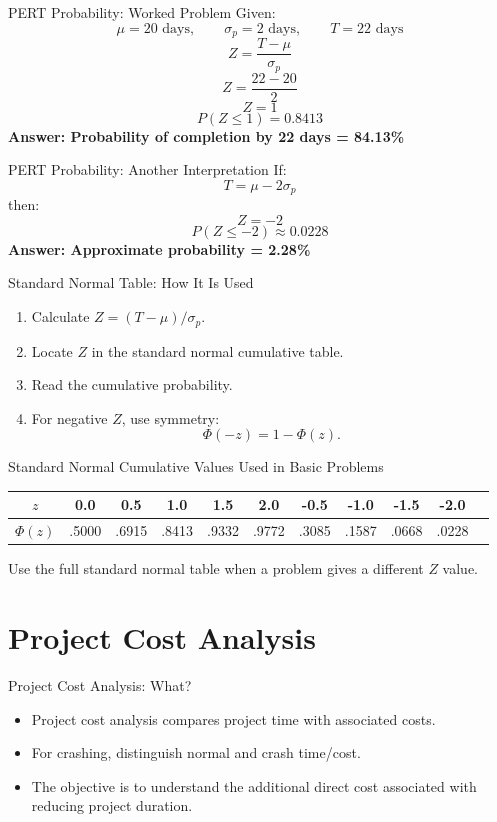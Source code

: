 \documentclass[aspectratio=169,10pt]{beamer}
\newcommand{\answer}[1]{\textbf{Answer: #1}}
\begin{document}
\begin{frame}{PERT Probability: Worked Problem}
Given:
\[
\mu=20\text{ days},\qquad \sigma_p=2\text{ days},\qquad T=22\text{ days}
\]
\pause
\[Z=\frac{T-\mu}{\sigma_p}\]
\pause
\[Z=\frac{22-20}{2}\]
\pause
\[\boxed{Z=1}\]
\pause
\[P(Z\le1)=0.8413\]
\pause
\answer{Probability of completion by 22 days = 84.13\%}
\end{frame}

\begin{frame}{PERT Probability: Another Interpretation}
If:
\[
T=\mu-2\sigma_p
\]
then:
\[
Z=-2
\]
\pause
\[
P(Z\le -2)\approx0.0228
\]
\answer{Approximate probability = 2.28\%}
\end{frame}

\begin{frame}{Standard Normal Table: How It Is Used}
\begin{enumerate}
  \item Calculate $Z=(T-\mu)/\sigma_p$.
  \item Locate $Z$ in the standard normal cumulative table.
  \item Read the cumulative probability.
  \item For negative $Z$, use symmetry:
  \[
  \Phi(-z)=1-\Phi(z).
  \]
\end{enumerate}
\end{frame}

\begin{frame}{Standard Normal Cumulative Values Used in Basic Problems}
\centering
\begin{tabular}{c|cccccccccc}
\toprule
$z$ & 0.0 & 0.5 & 1.0 & 1.5 & 2.0 & -0.5 & -1.0 & -1.5 & -2.0\\
\midrule
$\Phi(z)$ & .5000 & .6915 & .8413 & .9332 & .9772 & .3085 & .1587 & .0668 & .0228\\
\bottomrule
\end{tabular}
\vspace{0.3cm}

Use the full standard normal table when a problem gives a different $Z$ value.
\end{frame}

\section{Project Cost Analysis}

\begin{frame}{Project Cost Analysis: What?}
\begin{itemize}
  \item Project cost analysis compares project time with associated costs.
  \item For crashing, distinguish normal and crash time/cost.
  \item The objective is to understand the additional direct cost associated with reducing project duration.
\end{itemize}
\end{frame}
\end{document}

